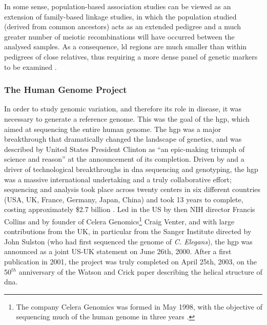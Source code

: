 In some sense, population-based association studies can be viewed as an extension of family-based linkage studies, in which the population studied (derived from common ancestors) acts as an extended pedigree and a much greater number of meiotic recombinations will have occurred between the analysed samples.
As a consequence, \gls{ld} regions are much smaller than within pedigrees of close relatives, thus requiring a more dense panel of genetic markers to be examined \cite{cordell2005genetic}.

\subsubsection{The Human Genome Project}
\label{sec:hgp}

In order to study genomic variation, and therefore its role in disease, it was necessary to generate a reference genome.
This was the goal of the \gls{hgp}, which aimed at sequencing the entire human genome.
The \gls{hgp} was 
a 
major breakthrough that dramatically changed the landscape of genetics, and was described by United States President Clinton as “an epic-making triumph of science and reason” \cite{clinton2000remarks} at the announcement of its completion.
Driven by and a driver of technological breakthroughs in \gls{dna} sequencing and genotyping, the \gls{hgp} was a massive international undertaking and a truly collaborative effort; sequencing and analysis took place across twenty centers in six different countries (USA, UK, France, Germany, Japan, China) and took 13 years to complete, costing approximately \$2.7 billion \cite{lander2011initial}.
Led in the US by then NIH director Francis Collins and by founder of Celera Genomics\footnote{The company Celera Genomics was formed in May 1998, with the objective of sequencing much of the human genome in three years \cite{venter1998shotgun}.} 
Craig Venter, and with large contributions from the UK, in particular from the Sanger Institute directed by John Sulston (who had first sequenced the genome of \textit{C. Elegans}), the \gls{hgp} was announced as a joint US-UK statement on June 26th, 2000.
After a first publication in 2001, the project was truly completed on April 25th, 2003, on the 50$^{th}$ anniversary of the Watson and Crick paper describing the helical structure of \gls{dna}.\\

